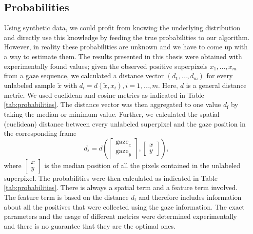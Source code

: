\subsection{Probabilities}
Using synthetic data, we could profit from knowing the underlying distribution and directly use this knowledge by feeding the true probabilities to our algorithm. 
However, in reality these probabilities are unknown and we have to come up with a way to estimate them. 
The results presented in this thesis were obtained with experimentally found values; given the observed positive superpixels $x_1,\dots,x_m$ from a gaze sequence, we calculated a distance vector $(d_1,\dots,d_m)$ for every unlabeled sample $\tilde x$ with $d_i = d(\tilde x, x_i), i = 1,\dots,m.$
Here, $d$ is a general distance metric. We used euclidean and cosine metrics as indicated in Table \ref{tab:probabilities}. 
The distance vector was then aggregated to one value $d_{\text{f}}$ by taking the median or minimum value. 
Further, we calculated the spatial (euclidean) distance between every unlabeled superpixel and the gaze position in the corresponding frame 
$$d_\text{s} = d\left(\begin{bmatrix} \text{gaze}_x \\ \text{gaze}_y \end{bmatrix}, \begin{bmatrix} x \\ y \end{bmatrix}\right),$$
where $\begin{bmatrix} x \\ y \end{bmatrix}$ is the median position of all the pixels contained in the unlabeled superpixel.
The probabilities were then calculated as indicated in Table \ref{tab:probabilities}.
There is always a spatial term and a feature term involved. The feature term is based on the distance $d_{\text{f}}$ and therefore includes information about all the positives that were collected using the gaze information. The exact parameters and the usage of different metrics were determined experimentally and there is no guarantee that they are the optimal ones.
